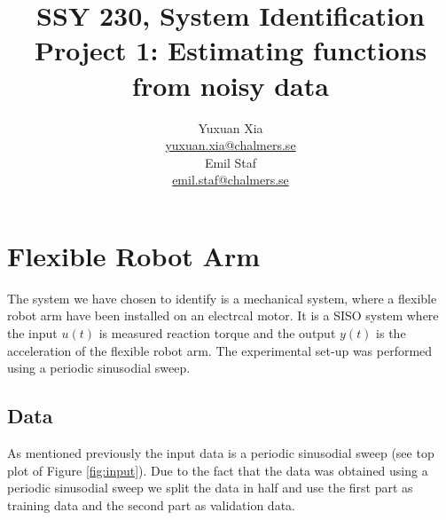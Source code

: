 \documentclass[]{article}
\title{SSY 230, System Identification\\
	Project 1: Estimating functions from noisy data}
\author{Yuxuan Xia\\ \href{mailto:yuxuan.xia@chalmers.se}{yuxuan.xia@chalmers.se}\\Emil Staf\\\href{mailto:emil.staf@chalmers.se}{emil.staf@chalmers.se}}
\begin{document}
\maketitle


\section{Flexible Robot Arm}
The system we have chosen to identify is a mechanical system, where a flexible robot arm have been installed on an electrcal motor. It is a SISO system where the input $u(t)$ is measured reaction torque and the output $y(t)$ is the acceleration of the flexible robot arm. The experimental set-up was performed using a periodic sinusodial sweep.

\subsection{Data}
As mentioned previously the input data is a periodic sinusodial sweep (see top plot of Figure \ref{fig:input}). Due to the fact that the data was obtained using a periodic sinusodial sweep we split the data in half and use the first part as training data and the second part as validation data.
\end{document}
